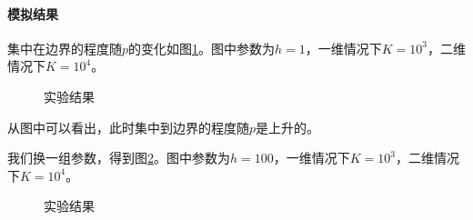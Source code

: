 \documentclass[12pt,a4paper]{article}
\begin{document}
\paragraph{模拟结果}

集中在边界的程度随$p$的变化如图\ref{fp1}。图中参数为$h=1$，一维情况下$K=10^3$，二维情况下$K=10^4$。
\begin{figure}[h]
\centering
{}
\caption{实验结果}
\label{fp1}
\end{figure}

从图中可以看出，此时集中到边界的程度随$p$是上升的。

我们换一组参数，得到图\ref{fp2}。图中参数为$h=100$，一维情况下$K=10^3$，二维情况下$K=10^4$。
\begin{figure}[h]
\centering
{}
\caption{实验结果}
\label{fp2}
\end{figure}
\end{document}
